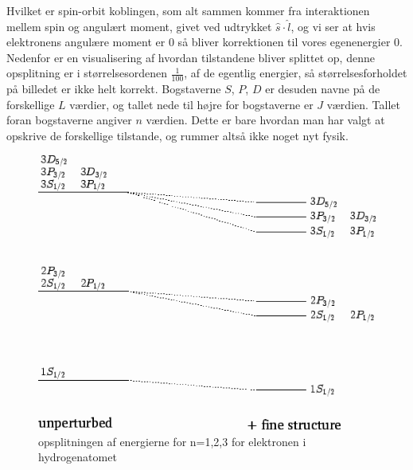 \documentclass[../../Atom-ogMolekylefysik.tex]{subfiles}
\begin{document}
Hvilket er spin-orbit koblingen, som alt sammen kommer fra interaktionen mellem spin og angulært moment, givet ved udtrykket $\hat{s}\cdot\hat{l}$, og vi ser at hvis elektronens angulære moment er 0 så bliver korrektionen til vores egenenergier 0. Nedenfor er en visualisering af hvordan tilstandene bliver splittet op, denne opsplitning er i størrelsesordenen $\frac{1}{100}$, af de egentlig energier, så størrelsesforholdet på billedet er ikke helt korrekt. Bogstaverne $S$, $P$, $D$ er desuden navne på de forskellige $L$ værdier, og tallet nede til højre for bogstaverne er $J$ værdien. Tallet foran bogstaverne angiver $n$ værdien. Dette er bare hvordan man har valgt at opskrive de forskellige tilstande, og rummer altså ikke noget nyt fysik. 
\begin{figure}[h]
    \centering
    \includegraphics[scale=0.5]{Atom-ogMolekylefysik/billeder/opsplitning.png}
    \caption{opsplitningen af energierne for n=1,2,3 for elektronen i hydrogenatomet}
    \label{fig:amo:vektor-projektion}
\end{figure}
\newpage
\end{document}
